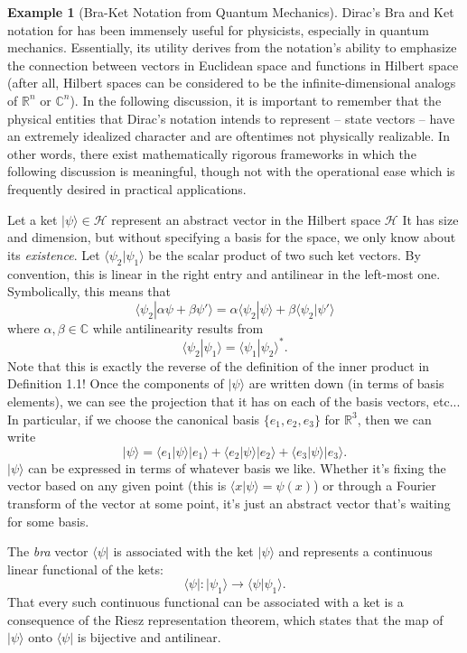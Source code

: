 \documentclass[psamsfonts]{amsart}
\theoremstyle{definition}
\newtheorem{exmp}[thm]{Example}
\theoremstyle{remark}
\numberwithin{equation}{section}
\begin{document}
\begin{exmp}[Bra-Ket Notation from Quantum Mechanics]
Dirac's Bra and Ket notation for has been immensely useful for physicists, especially in quantum mechanics. Essentially, its utility derives from the notation's ability to emphasize the connection between vectors in Euclidean space and functions in Hilbert space (after all, Hilbert spaces can be considered to be the infinite-dimensional analogs of $\mathbb{R}^n$ or $\mathbb{C}^n$). In the following discussion, it is important to remember that the physical entities that Dirac's notation intends to represent -- state vectors -- have an extremely idealized character and are oftentimes not physically realizable. In other words, there exist mathematically rigorous frameworks in which the following discussion is meaningful, though not with the operational ease which is frequently desired in practical applications. 

Let a ket $|\psi \rangle \in \mathcal{H}$ represent an abstract vector in the Hilbert space $\mathcal{H}$ It has size and dimension, but without specifying a basis for the space, we only know about its \textit{existence}. Let $\langle \psi _2 | \psi _1 \rangle $ be the scalar product of two such ket vectors. By convention, this is linear in the right entry and antilinear in the left-most one. Symbolically, this means that 
$$\langle \psi _2 | \alpha \psi + \beta \psi ' \rangle = \alpha \langle \psi _2 | \psi \rangle + \beta \langle \psi _2 | \psi ' \rangle $$
where $\alpha, \beta \in \mathbb{C}$ while antilinearity results from 
$$\langle \psi _2 | \psi _1 \rangle = \langle \psi _1 | \psi _2 \rangle ^*. $$
Note that this is exactly the reverse of the definition of the inner product in Definition 1.1! Once the components of $| \psi \rangle$ are written down (in terms of basis elements), we can see the projection that it has on each of the basis vectors, etc... In particular, if we choose the canonical basis $\{ e_1, e_2 ,e_3 \}$ for $\mathbb{R}^3$, then we can write 
$$| \psi \rangle = \langle e_1 | \psi \rangle |e_1 \rangle + \langle e_2 | \psi \rangle |e_2 \rangle + \langle e_3 | \psi \rangle |e_3 \rangle .$$
$|\psi \rangle $ can be expressed in terms of whatever basis we like. Whether it's fixing the vector based on any given point (this is $\langle x | \psi \rangle = \psi (x)$) or through a Fourier transform of the vector at some point, it's just an abstract vector that's waiting for some basis. 

The \textit{bra} vector $\langle \psi |$ is associated with the ket $|\psi \rangle$ and represents a continuous linear functional of the kets: 
$$\langle \psi | :  | \psi _1 \rangle \rightarrow \langle \psi | \psi _1 \rangle. $$
That every such continuous functional can be associated with a ket is a consequence of the Riesz representation theorem, which states that the map of $| \psi \rangle$ onto $\langle \psi |$ is bijective and antilinear. 

\end{exmp}
\end{document}
